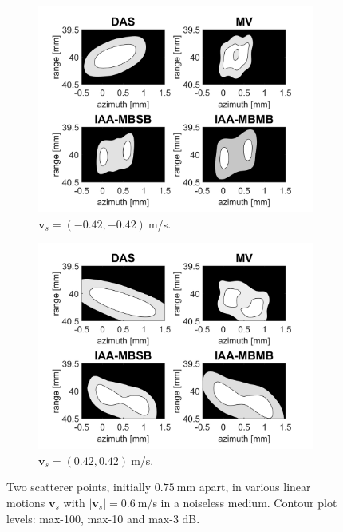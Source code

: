 \begin{figure}[ht]
\begin{subfigure}[t]{0.48\linewidth}
        \includegraphics[width=\linewidth]{./images/results/2.2/motion_45_-06.png}
        \caption{$\boldsymbol{v}_s = (-0.42, -0.42)~$m/s.}
    \end{subfigure}
    \quad
    \begin{subfigure}[t]{0.48\linewidth}
        \includegraphics[width=\linewidth]{./images/results/2.2/motion_45_06.png}
        \caption{$\boldsymbol{v}_s = (0.42, 0.42)~$m/s.}
    \end{subfigure}
	\caption[Two scatterer points, initially $0.75~$mm apart, in various linear motions $\boldsymbol{v}_s$ with $|\boldsymbol{v}_s|=0.6~$m/s in a noiseless medium.]{Two scatterer points, initially $0.75~$mm apart, in various linear motions $\boldsymbol{v}_s$ with $|\boldsymbol{v}_s|=0.6~$m/s in a noiseless medium. Contour plot levels: max-100, max-10 and max-3 dB.}
	\label{fig:linear_motion_double}
\end{figure}
